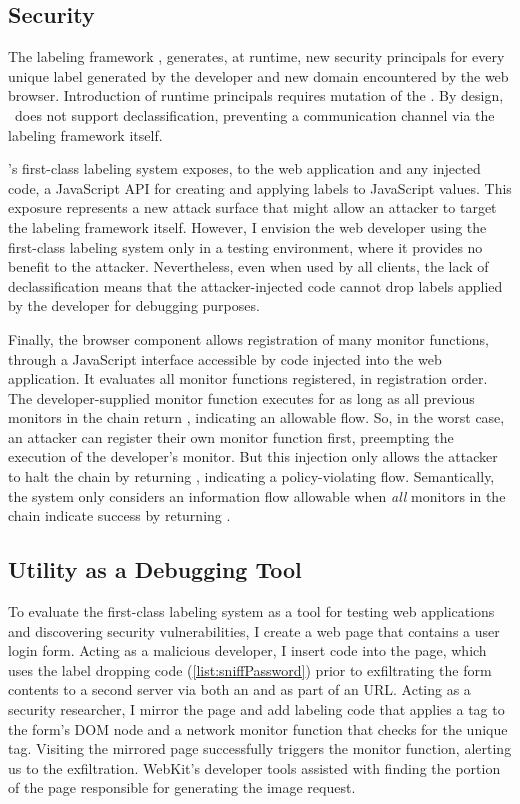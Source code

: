\subsection{Security}

The labeling framework \FlowCore, generates, at runtime, new security principals for every unique label generated by the developer and new domain encountered by the web browser.
Introduction of runtime principals requires mutation of the \FlowLabelRegistry.
By design, \FlowCore\ does not support declassification, preventing a communication channel via the labeling framework itself.

\FlowCore's first-class labeling system exposes, to the web application and any injected code, a JavaScript API for creating and applying labels to JavaScript values.
This exposure represents a new attack surface that might allow an attacker to target the labeling framework itself.
However, I envision the web developer using the first-class labeling system only in a testing environment, where it provides no benefit to the attacker.
Nevertheless, even when used by all clients, the lack of declassification means that the attacker-injected code cannot drop labels applied by the developer for debugging purposes.

Finally, the browser component allows registration of many monitor functions, through a JavaScript interface accessible by code injected into the web application.
It evaluates all monitor functions registered, in registration order.
The developer-supplied monitor function executes for as long as all previous monitors in the chain return , indicating an allowable flow.
So, in the worst case, an attacker can register their own monitor function first, preempting the execution of the developer's monitor.
But this injection only allows the attacker to halt the chain by returning , indicating a policy-violating flow.
Semantically, the system only considers an information flow allowable when \emph{all} monitors in the chain indicate success by returning .

\subsection{Utility as a Debugging Tool}

To evaluate the first-class labeling system as a tool for testing web applications and discovering security vulnerabilities, I create a web page that contains a user login form.
Acting as a malicious developer, I insert code into the page, which uses the  label dropping code (\autoref{list:sniffPassword}) prior to exfiltrating the form contents to a second server via both an  and as part of an  URL.
Acting as a security researcher, I mirror the page and add labeling code that applies a tag to the form's DOM node and a network monitor function that checks for the unique tag.
Visiting the mirrored page successfully triggers the monitor function, alerting us to the exfiltration.
WebKit's developer tools assisted with finding the portion of the page responsible for generating the image request.

